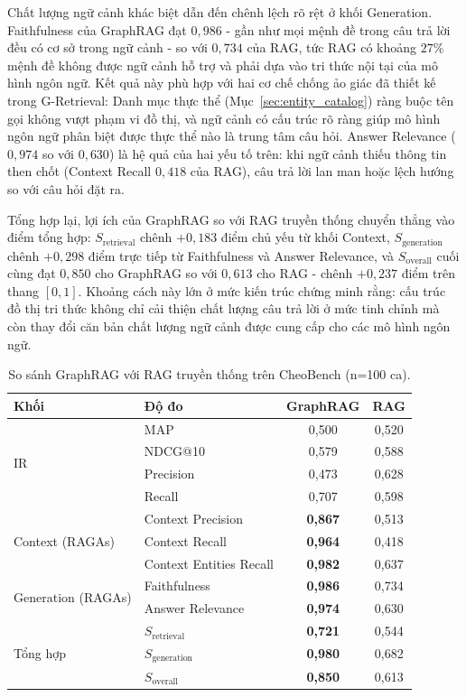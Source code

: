 Chất lượng ngữ cảnh khác biệt dẫn đến chênh lệch rõ rệt ở khối Generation. Faithfulness của GraphRAG đạt $0,986$ - gần như mọi mệnh đề trong câu trả lời đều có cơ sở trong ngữ cảnh - so với $0,734$ của RAG, tức RAG có khoảng $27\%$ mệnh đề không được ngữ cảnh hỗ trợ và phải dựa vào tri thức nội tại của mô hình ngôn ngữ. Kết quả này phù hợp với hai cơ chế chống ảo giác đã thiết kế trong G-Retrieval: Danh mục thực thể (Mục~\ref{sec:entity_catalog}) ràng buộc tên gọi không vượt phạm vi đồ thị, và ngữ cảnh có cấu trúc rõ ràng giúp mô hình ngôn ngữ phân biệt được thực thể nào là trung tâm câu hỏi. Answer Relevance ($0,974$ so với $0,630$) là hệ quả của hai yếu tố trên: khi ngữ cảnh thiếu thông tin then chốt (Context Recall $0,418$ của RAG), câu trả lời lan man hoặc lệch hướng so với câu hỏi đặt ra.

Tổng hợp lại, lợi ích của GraphRAG so với RAG truyền thống chuyển thẳng vào điểm tổng hợp: $S_{\text{retrieval}}$ chênh $+0,183$ điểm chủ yếu từ khối Context, $S_{\text{generation}}$ chênh $+0,298$ điểm trực tiếp từ Faithfulness và Answer Relevance, và $S_{\text{overall}}$ cuối cùng đạt $0,850$ cho GraphRAG so với $0,613$ cho RAG - chênh $+0,237$ điểm trên thang $[0, 1]$. Khoảng cách này lớn ở mức kiến trúc chứng minh rằng: cấu trúc đồ thị tri thức không chỉ cải thiện chất lượng câu trả lời ở mức tinh chỉnh mà còn thay đổi căn bản chất lượng ngữ cảnh được cung cấp cho các mô hình ngôn ngữ.

\begin{table}[h]
\centering
\caption{So sánh GraphRAG với RAG truyền thống trên CheoBench (n=100 ca).}
\label{tab:baseline_results}
\begin{tabular}{llcc}
\hline
\textbf{Khối} & \textbf{Độ đo} & \textbf{GraphRAG} & \textbf{RAG} \\
\hline
\multirow{4}{*}{IR}
& MAP            & 0,500 & 0,520 \\
& NDCG@10        & 0,579 & 0,588 \\
& Precision      & 0,473 & 0,628 \\
& Recall         & 0,707 & 0,598 \\
\hline
\multirow{3}{*}{Context (RAGAs)}
& Context Precision         & \textbf{0,867} & 0,513 \\
& Context Recall            & \textbf{0,964} & 0,418 \\
& Context Entities Recall   & \textbf{0,982} & 0,637 \\
\hline
\multirow{2}{*}{Generation (RAGAs)}
& Faithfulness     & \textbf{0,986} & 0,734 \\
& Answer Relevance & \textbf{0,974} & 0,630 \\
\hline
\multirow{3}{*}{Tổng hợp}
& $S_{\text{retrieval}}$  & \textbf{0,721} & 0,544 \\
& $S_{\text{generation}}$ & \textbf{0,980} & 0,682 \\
& $S_{\text{overall}}$    & \textbf{0,850} & 0,613 \\
\hline
\end{tabular}
\end{table}

